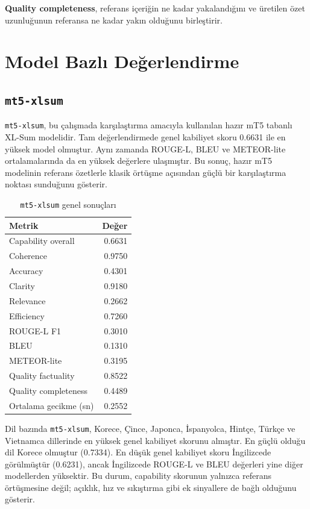 \documentclass[12pt,a4paper]{article}
\begin{document}
\textbf{Quality completeness}, referans içeriğin ne kadar yakalandığını ve üretilen özet uzunluğunun referansa ne kadar yakın olduğunu birleştirir.

\section{Model Bazlı Değerlendirme}

\subsection{\texttt{mt5-xlsum}}

\texttt{mt5-xlsum}, bu çalışmada karşılaştırma amacıyla kullanılan hazır mT5 tabanlı XL-Sum modelidir. Tam değerlendirmede genel kabiliyet skoru 0.6631 ile en yüksek model olmuştur. Aynı zamanda ROUGE-L, BLEU ve METEOR-lite ortalamalarında da en yüksek değerlere ulaşmıştır. Bu sonuç, hazır mT5 modelinin referans özetlerle klasik örtüşme açısından güçlü bir karşılaştırma noktası sunduğunu gösterir.

\begin{table}[H]
\centering
\caption{\texttt{mt5-xlsum} genel sonuçları}
\begin{tabular}{lr}
\toprule
Metrik & Değer \\
\midrule
Capability overall & 0.6631 \\
Coherence & 0.9750 \\
Accuracy & 0.4301 \\
Clarity & 0.9180 \\
Relevance & 0.2662 \\
Efficiency & 0.7260 \\
ROUGE-L F1 & 0.3010 \\
BLEU & 0.1310 \\
METEOR-lite & 0.3195 \\
Quality factuality & 0.8522 \\
Quality completeness & 0.4489 \\
Ortalama gecikme (sn) & 0.2552 \\
\bottomrule
\end{tabular}
\end{table}

Dil bazında \texttt{mt5-xlsum}, Korece, Çince, Japonca, İspanyolca, Hintçe, Türkçe ve Vietnamca dillerinde en yüksek genel kabiliyet skorunu almıştır. En güçlü olduğu dil Korece olmuştur (0.7334). En düşük genel kabiliyet skoru İngilizcede görülmüştür (0.6231), ancak İngilizcede ROUGE-L ve BLEU değerleri yine diğer modellerden yüksektir. Bu durum, capability skorunun yalnızca referans örtüşmesine değil; açıklık, hız ve sıkıştırma gibi ek sinyallere de bağlı olduğunu gösterir.
\end{document}
